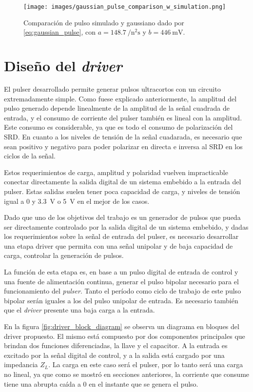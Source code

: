 \begin{figure}[t!]
    \centering
    \texttt{[image: images/gaussian\_pulse\_comparison\_w\_simulation.png]}
    \caption{Comparación de pulso simulado y gaussiano dado por
    \ref{eq:gaussian_pulse}, con $a= \qty{148.7}{\per\square\nano\second}$ y
    $b=\qty{446}{\milli\volt}$.}
    \label{fig:gaussian_pulse_comparison_w_simulation}
\end{figure}

\section{Diseño del \textit{driver}}

El pulser desarrollado permite generar pulsos ultracortos con un circuito
extremadamente simple. Como fuese explicado anteriormente, la amplitud del pulso
generado depende linealmente de la amplitud de la señal cuadrada de entrada, y
el consumo de corriente del pulser también es lineal con la amplitud. Este
consumo es considerable, ya que es todo el consumo de polarización del SRD. En
cuanto a los niveles de tensión de la señal cuadarada, es necesario que sean
positivo y negativo para poder polarizar en directa e inversa al SRD en los
ciclos de la señal.

Estos requerimientos de carga, amplitud y polaridad vuelven impracticable conectar
directamente la salida digital de un sistema embebido a la entrada del pulser.
Estas salidas suelen tener poca capacidad de carga, y niveles de tensión igual a
$0$ y \qty{3.3}{\volt} o \qty{5}{\volt} en el mejor de los casos.

Dado que uno de los objetivos del trabajo es un generador de pulsos que pueda
ser directamente controlado por la salida digital de un sistema embebido, y
dadas los requerimientos sobre la señal de entrada del pulser, es necesario
desarrollar una etapa driver que permita con una señal unipolar y de baja
capacidad de carga, controlar la generación de pulsos.

La función de esta etapa es, en base a un pulso digital de entrada de control y
una fuente de alimentación continua, generar el pulso bipolar necesario para el
funcionamiento del \textit{pulser}. Tanto el período como ciclo de trabajo de
este pulso bipolar serán iguales a los del pulso unipolar de entrada. Es
necesario también que el \textit{driver} presente una baja carga a la entrada.

En la figura \ref{fig:driver_block_diagram} se observa un diagrama en bloques
del driver propuesto. El mismo está compuesto por dos componentes principales
que brindan dos funciones diferenciadas, la llave y el capacitor. A la entrada
es excitado por la señal digital de control, y a la salida está cargado por una
impedancia $Z_L$. La carga en este caso será el pulser, por lo tanto será una
carga no lineal, ya que como se mostró en secciones anteriores, la corriente que
consume tiene una abrupta caída a 0 en el instante que se genera el pulso.

